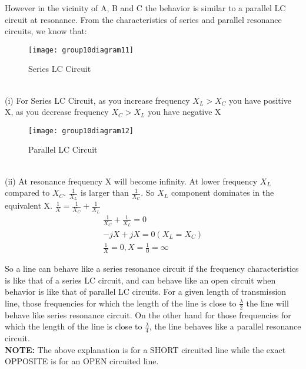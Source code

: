 However in the vicinity of A, B and C the behavior is similar to a parallel LC circuit at resonance. From the characteristics of series and parallel resonance circuits, we know that:\\
\begin{figure}[h]
	\centering
	\texttt{[image: group10diagram11]}
	\caption{Series LC Circuit}
\end{figure}\\(i) For Series LC Circuit, as you increase frequency $ X_{L} > X_{C} $ you have positive X, as you decrease frequency $ X_{C} > X_{L} $ you have negative X\\
\begin{figure}[h]
	\centering
	\texttt{[image: group10diagram12]}
	\caption{Parallel LC Circuit}
\end{figure}\\(ii) At resonance frequency X will become infinity. At lower frequency $ X_{L} $ compared to $ X_{C} $. $ \frac{1}{X_{L}} $ is larger than $ \frac{1}{X_{C}} $. So $ X_{L} $ component dominates in the equivalent X. $ \frac{1}{X} = \frac{1}{X_{C}} + \frac{1}{X_{L}}$
\begin{align*}
\frac{1}{X_{C}} + \frac{1}{X_{L}} = 0\\
-jX + jX = 0 (X_{L} = X_{C})\\
\frac{1}{X} = 0, X = \frac{1}{0} = \infty
\end{align*}

So a line can behave like a series resonance circuit  if the frequency characteristics is like that of a series LC circuit, and can behave like an open circuit when behavior is like that of parallel LC circuits.
For a given length of transmission line, those frequencies for which the length of the line is close to $ \frac{\lambda}{2} $ the line will behave like series resonance circuit. On the other hand for those frequencies for which the length of the line is close to $ \frac{\lambda}{4} $, the line behaves like a parallel resonance circuit.\\
\textbf{NOTE:} The above explanation is for a SHORT circuited line while the exact OPPOSITE is for an OPEN circuited line.\\

